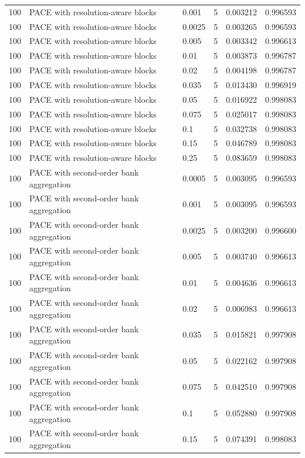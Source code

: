\begin{tabular}{llllll}
100 & PACE with resolution-aware blocks & 0.001 & 5 & 0.003212 & 0.996593 \\
100 & PACE with resolution-aware blocks & 0.0025 & 5 & 0.003265 & 0.996593 \\
100 & PACE with resolution-aware blocks & 0.005 & 5 & 0.003342 & 0.996613 \\
100 & PACE with resolution-aware blocks & 0.01 & 5 & 0.003873 & 0.996787 \\
100 & PACE with resolution-aware blocks & 0.02 & 5 & 0.004198 & 0.996787 \\
100 & PACE with resolution-aware blocks & 0.035 & 5 & 0.013430 & 0.996919 \\
100 & PACE with resolution-aware blocks & 0.05 & 5 & 0.016922 & 0.998083 \\
100 & PACE with resolution-aware blocks & 0.075 & 5 & 0.025017 & 0.998083 \\
100 & PACE with resolution-aware blocks & 0.1 & 5 & 0.032738 & 0.998083 \\
100 & PACE with resolution-aware blocks & 0.15 & 5 & 0.046789 & 0.998083 \\
100 & PACE with resolution-aware blocks & 0.25 & 5 & 0.083659 & 0.998083 \\
100 & PACE with second-order bank aggregation & 0.0005 & 5 & 0.003095 & 0.996593 \\
100 & PACE with second-order bank aggregation & 0.001 & 5 & 0.003095 & 0.996593 \\
100 & PACE with second-order bank aggregation & 0.0025 & 5 & 0.003200 & 0.996600 \\
100 & PACE with second-order bank aggregation & 0.005 & 5 & 0.003740 & 0.996613 \\
100 & PACE with second-order bank aggregation & 0.01 & 5 & 0.004636 & 0.996613 \\
100 & PACE with second-order bank aggregation & 0.02 & 5 & 0.006983 & 0.996613 \\
100 & PACE with second-order bank aggregation & 0.035 & 5 & 0.015821 & 0.997908 \\
100 & PACE with second-order bank aggregation & 0.05 & 5 & 0.022162 & 0.997908 \\
100 & PACE with second-order bank aggregation & 0.075 & 5 & 0.042510 & 0.997908 \\
100 & PACE with second-order bank aggregation & 0.1 & 5 & 0.052880 & 0.997908 \\
100 & PACE with second-order bank aggregation & 0.15 & 5 & 0.074391 & 0.998083 \\

\end{tabular}
